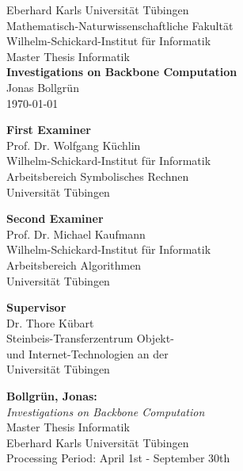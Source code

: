 \begin{titlepage}
 \begin{center}
  {\LARGE Eberhard Karls Universität Tübingen}\\
  {\large Mathematisch-Naturwissenschaftliche Fakultät \\
Wilhelm-Schickard-Institut für Informatik\\[3.0cm]}
  {\huge Master Thesis Informatik\\[2.5cm]}
  {\Large\bf  Investigations on Backbone Computation\\[1.5cm]}
 {\large Jonas Bollgrün}\\[0.5cm]
	\today \\[4.0cm]

\begin{multicols}{2}
\begin{center}{
\small\bf First Examiner}\\[0.2cm]
{\large Prof. Dr. Wolfgang Küchlin}\\
  {\footnotesize Wilhelm-Schickard-Institut für Informatik\\Arbeitsbereich Symbolisches Rechnen\\
	Universität Tübingen}	
\end{center}
\begin{center}{
\small\bf Second Examiner}\\[0.2cm]
{\large Prof. Dr. Michael Kaufmann}\\
  {\footnotesize Wilhelm-Schickard-Institut für Informatik\\Arbeitsbereich Algorithmen\\
	Universität Tübingen}	
\end{center}
	
\end{multicols}

\begin{center}
{\small\bf Supervisor}\\[0.2cm]
{\large Dr. Thore Kübart}\\
  {  \footnotesize Steinbeis-Transferzentrum Objekt-\\und Internet-Technologien an der\\ Universität Tübingen}
  \end{center}
	
  \end{center}
\end{titlepage}




\thispagestyle{empty}
\vspace*{\fill}
\begin{minipage}{11.2cm}
\textbf{Bollgrün, Jonas:}\\
\emph{Investigations on Backbone Computation}\\
Master Thesis Informatik\\
Eberhard Karls Universität Tübingen\\
Processing Period: April 1st - September 30th
\end{minipage}
\newpage